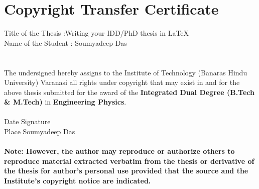 
\chapter*{\vspace{-3cm} \centering \Large Copyright Transfer Certificate}
Title of the Thesis :Writing your IDD/PhD thesis in \texorpdfstring{\LaTeX}{LaTeX} \\
Name of the Student : Soumyadeep Das \\
\\
\hspace*{5.5cm}{ \centering  \bfseries \large Copyright Transfer}\\
The undersigned hereby assigns to the Institute of Technology (Banaras Hindu University) Varanasi all rights under copyright that may exist in and for the above thesis submitted for the award of the \textbf{Integrated Dual Degree (B.Tech \& M.Tech)} in \textbf{Engineering Physics}. \\
\\
Date   \hspace{5.1cm}  Signature      \\
Place \hspace{5cm} Soumyadeep Das \\
\\
{\bfseries Note: However, the author may reproduce or authorize others to reproduce material extracted verbatim from the thesis or derivative of the thesis for author's personal use provided that the source and the Institute's copyright notice are indicated.}